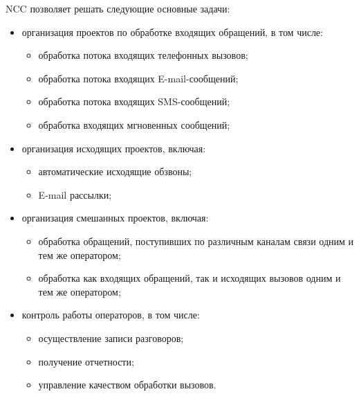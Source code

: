 NCC позволяет решать следующие основные задачи:
\begin{itemize}
    \item организация проектов по обработке входящих обращений, в том числе:
        \begin{itemize}
            \item обработка потока входящих телефонных вызовов;
            \item обработка потока входящих E-mail-сообщений;
            \item обработка потока входящих SMS-сообщений;
            \item обработка входящих мгновенных сообщений;
        \end{itemize}
    \item организация исходящих проектов, включая:
        \begin{itemize}
            \item автоматические исходящие обзвоны;
            \item E-mail рассылки;
        \end{itemize}
    \item организация смешанных проектов, включая:
        \begin{itemize}
            \item обработка обращений, поступивших по различным каналам связи одним и тем же оператором;
            \item обработка как входящих обращений, так и исходящих вызовов одним и тем же оператором;
        \end{itemize}
    \item контроль работы операторов, в том числе:
        \begin{itemize}
            \item осуществление записи разговоров;
            \item получение отчетности;
            \item управление качеством обработки вызовов.
        \end{itemize}
\end{itemize}

